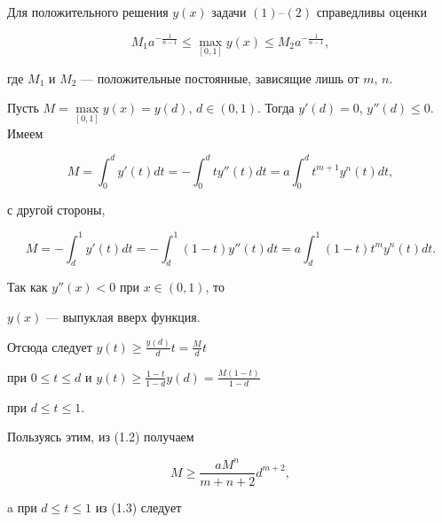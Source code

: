 \begin{thms}


Для положительного решения $y(x)$ задачи $(1)$--$(2)$ справедливы оценки


\begin{equation}


M_1a^{-\frac{1}{n-1}} \le \max_{[0,1]}y(x) \le M_2a^{-\frac{1}{n-1}},


\end{equation}


где $M_1$ и $M_2$ --- положительные постоянные, зависящие лишь от $m$, $n$.


\end{thms}





\begin{pf} Пусть $M = \max\limits_{[0,1]}y(x) = 


y(d)$, $d\in(0, 1)$. Тогда $y'(d) = 0$, $y''(d) \le 0$. Имеем 


\begin{equation}


M = \int_0^d y'(t)dt = -\int_0^d ty''(t)dt =


a\int_0^d t^{m+1}y^n(t)dt,


\end{equation} 


с другой стороны,


\begin{equation}


M = -\int_d^1 y'(t)dt = -\int_d^1(1-t)y''(t)dt = 


a\int_d^1(1-t)t^my^n(t)dt.


\end{equation}


Так как $y''(x) < 0$ при $x\in(0, 1)$, то


$y(x)$ --- выпуклая вверх функция.


Отсюда следует $y(t) \ge \frac{y(d)}{d}t=\frac{M}{d}t$


при $0\le t\le d$ и $y(t)\ge \frac{1-t}{1-d}y(d)=\frac{M(1-t)}{1-d}$


при $d\le t\le 1$.


Пользуясь этим, из (1.2) получаем


\begin{equation}


M \ge \frac{aM^n}{m+n+2}d^{m+2},


\end{equation}


a при $d\le t\le 1$ из (1.3) следует



\end{pf}
